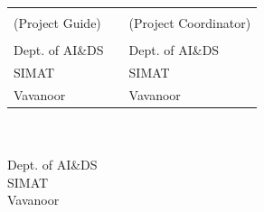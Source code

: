 	
	\begin{singlespace}
		\vspace*{2cm}
		\begin{table}[h!]
			\centering
			\begin{tabular}{p{7cm} p{0.9cm} p{7cm}} 
				\textbf{\guide} && \textbf{\projcordinatorA} \\
				(Project Guide) &&  (Project Coordinator)\\
				\guidedes & & \projcordinatorAdes\\ 
				Dept. of AI\&DS && Dept. of AI\&DS\\ 
				SIMAT & & SIMAT\\
				Vavanoor && Vavanoor\\
			\end{tabular}
			
		\end{table}
		
		\vspace*{1.3cm}
		
		\begin{center}
			
			\textbf{\hod} \\ 
			\hoddes\\ 
			Dept. of AI\&DS\\ 
			SIMAT\\
			Vavanoor\\
			
		\end{center}
	\end{singlespace}
	
	\thispagestyle{empty}
